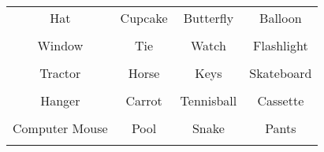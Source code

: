 \documentclass[12pt,a4paper]{article}
\begin{document}
\thispagestyle{empty}
\begin{table}[]
\centering
\Huge
\begin{tabular}{cccc}
 Hat& Cupcake& Butterfly& Balloon\\  & & & \\
 Window& Tie& Watch& Flashlight\\  & & & \\
 Tractor& Horse& Keys& Skateboard\\  & & & \\
 Hanger& Carrot& Tennisball& Cassette\\  & & & \\
 Computer Mouse& Pool& Snake& Pants\\  & & & \\
\end{tabular}
\end{table}
\end{document}
